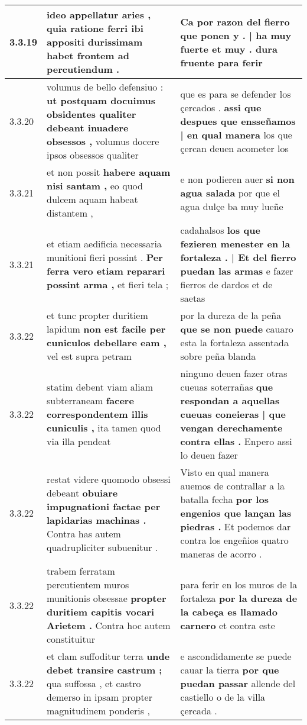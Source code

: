 \begin{tabular}{|p{1cm}|p{6.5cm}|p{6.5cm}|}
3.3.19 & ideo appellatur aries , \textbf{ quia ratione ferri ibi appositi durissimam habet } frontem ad percutiendum . & Ca por razon del fierro \textbf{ que ponen y . | ha muy fuerte et muy . } dura fruente para ferir \\\hline
3.3.20 & volumus de bello defensiuo : \textbf{ ut postquam docuimus obsidentes qualiter debeant inuadere obsessos , } volumus docere ipsos obsessos qualiter & que es para se defender los çercados . \textbf{ assi que despues que ensseñamos | en qual manera } los que çercan deuen acometer los \\\hline
3.3.21 & et non possit \textbf{ habere aquam nisi santam , } eo quod dulcem aquam habeat distantem , & e non podieren auer \textbf{ si non agua salada } por que el agua dulçe ba muy lueñe \\\hline
3.3.21 & et etiam aedificia necessaria munitioni fieri possint . \textbf{ Per ferra vero etiam reparari possint arma , } et fieri tela ; & cadahalsos \textbf{ los que fezieren menester en la fortaleza . | Et del fierro puedan las armas } e fazer fierros de dardos et de saetas \\\hline
3.3.22 & et tunc propter duritiem lapidum \textbf{ non est facile per cuniculos debellare eam , } vel est supra petram & por la dureza de la peña \textbf{ que se non puede } cauaro esta la fortaleza assentada sobre peña blanda \\\hline
3.3.22 & statim debent viam aliam subterraneam \textbf{ facere correspondentem illis cuniculis , } ita tamen quod via illa pendeat & ninguno deuen fazer otras cueuas soterrañas \textbf{ que respondan a aquellas cueuas coneieras | que vengan derechamente contra ellas . } Enpero assi lo deuen fazer \\\hline
3.3.22 & restat videre quomodo obsessi debeant \textbf{ obuiare impugnationi factae per lapidarias machinas . } Contra has autem quadrupliciter subuenitur . & Visto en qual manera auemos de contrallar a la batalla fecha \textbf{ por los engenios que lançan las piedras . } Et podemos dar contra los engeñios quatro maneras de acorro . \\\hline
3.3.22 & trabem ferratam percutientem muros munitionis obsessae \textbf{ propter duritiem capitis vocari Arietem . } Contra hoc autem constituitur & para ferir en los muros de la fortaleza \textbf{ por la dureza de la cabeça es llamado carnero } et contra este \\\hline
3.3.22 & et clam suffoditur terra \textbf{ unde debet transire castrum ; } qua suffossa , et castro demerso in ipsam propter magnitudinem ponderis , & e ascondidamente se puede cauar la tierra \textbf{ por que puedan passar } allende del castiello o de la villa çercada . \\\hline

\end{tabular}
